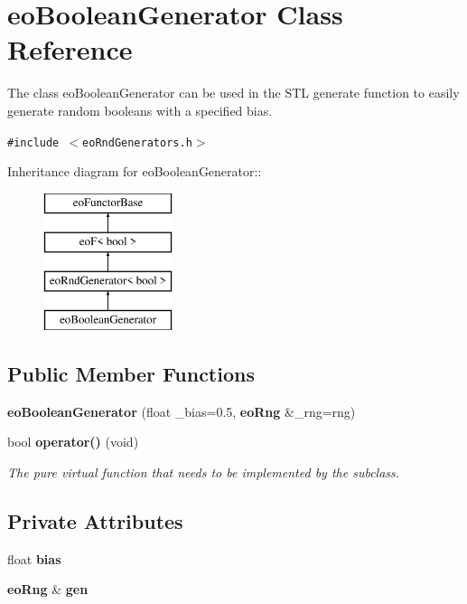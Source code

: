 \section{eo\-Boolean\-Generator Class Reference}
\label{classeo_boolean_generator}
The class eo\-Boolean\-Generator can be used in the STL generate function to easily generate random booleans with a specified bias.  


{\tt \#include $<$eo\-Rnd\-Generators.h$>$}

Inheritance diagram for eo\-Boolean\-Generator::\begin{figure}[H]
\begin{center}
\leavevmode
\includegraphics[height=4cm]{classeo_boolean_generator}
\end{center}
\end{figure}
\subsection*{Public Member Functions}
\begin{CompactItemize}
\item 
{\bf eo\-Boolean\-Generator} (float \_\-bias=0.5, {\bf eo\-Rng} \&\_\-rng=rng)\label{classeo_boolean_generator_a0}

\item 
bool {\bf operator()} (void)\label{classeo_boolean_generator_a1}

\begin{CompactList}\small\item\em The pure virtual function that needs to be implemented by the subclass. \item\end{CompactList}\end{CompactItemize}
\subsection*{Private Attributes}
\begin{CompactItemize}
\item 
float {\bf bias}\label{classeo_boolean_generator_r0}

\item 
{\bf eo\-Rng} \& {\bf gen}\label{classeo_boolean_generator_r1}

\end{CompactItemize}


